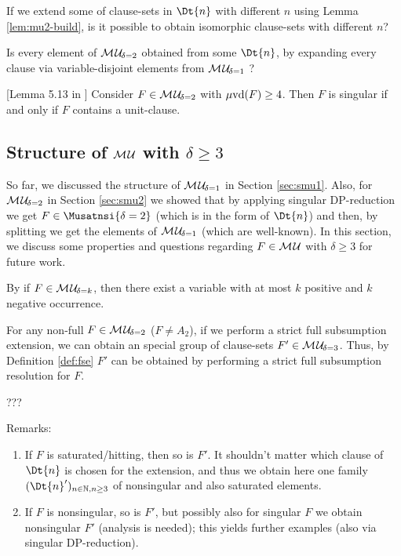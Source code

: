 \documentclass{report}
\begin{document}
\begin{quest}\label{que:mu-2-ism}
If we extend some of clause-sets in $\Dt{n}$ with different $n$ using Lemma \ref{lem:mu2-build}, is it possible to obtain isomorphic clause-sets with different $n$?
\end{quest}

\begin{quest}\label{que:mu2-from-mu1}
Is every element of $\mathcal{M\hspace{0.8pt}U}_{\!\delta=2}$ obtained from some $\Dt{n}$, by expanding every clause via variable-disjoint elements from $\mathcal{M\hspace{0.8pt}U}_{\!\delta=1}$ ?
\end{quest}

\begin{lem}\label{lem:mu2-sing}
[Lemma 5.13 in \cite{h9}]  Consider $F \in \mathcal{M\hspace{0.8pt}U}_{\!\delta=2}$ with $\operatorname{\mu\!\operatorname{vd}}(F) \ge 4$. Then $F$ is singular if and only if $F$ contains a unit-clause.
\end{lem}
\subsection{Structure of $\mathcal{M\hspace{0.8pt}U}$ with $\delta \ge 3$}
\label{sec:smu3}

So far, we discussed the structure of $\mathcal{M\hspace{0.8pt}U}_{\!\delta=1}$ in Section \ref{sec:smu1}. Also, for $\mathcal{M\hspace{0.8pt}U}_{\!\delta=2}$ in Section \ref{sec:smu2} we showed that by applying singular DP-reduction we get $F \in \Musatnsi{\delta=2}$ (which is in the form of $\Dt{n} $) and then, by splitting we get the elements of $\mathcal{M\hspace{0.8pt}U}_{\!\delta=1}$ (which are well-known). In this section, we discuss some properties and questions regarding $F \in \mathcal{M\hspace{0.8pt}U}$ with $\delta \ge 3$ for future work.

\begin{lem}\label{lem:muk-k}
By \cite{h27} if $F \in \mathcal{M\hspace{0.8pt}U}_{\!\delta=k}$, then there exist a variable with at most $k$ positive and $k$ negative occurrence. %
\end{lem}

\begin{lem}\label{lem:mu2tomu3}
For any non-full $F \in \mathcal{M\hspace{0.8pt}U}_{\!\delta=2}$ ($F \not = A_2$), if we perform a strict full subsumption extension, we can obtain an special group of clause-sets $F' \in \mathcal{M\hspace{0.8pt}U}_{\!\delta=3}$. Thus, by Definition \ref{def:fse} $F'$ can be obtained by performing a strict full subsumption resolution for $F$.
\end{lem}
\begin{prf}
???
\end{prf}
Remarks:
\begin{enumerate}
\item If $F$ is saturated/hitting, then so is $F'$. It shouldn't matter which clause of $\Dt{n}$ is chosen for the extension, and thus we obtain here one family $(\Dt{n}')_{n \in \NN, n \ge 3}$ of nonsingular and also saturated elements.
\item If $F$ is nonsingular, so is $F'$, but possibly also for singular $F$ we obtain nonsingular $F'$ (analysis is needed); this yields further examples (also via singular DP-reduction).
\end{enumerate}
\end{document}
